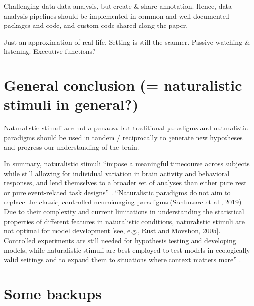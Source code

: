 

%
Challenging data data analysis, but create \& share annotation.
%
Hence, data analysis pipelines should be implemented in common and
well-documented packages and code, and custom code shared along the paper.

%
Just an approximation of real life.
%
Setting is still the scanner.
%
Passive watching \& listening.
%
Executive functions?



\section{General conclusion (= naturalistic stimuli in general?)}
%
Naturalistic stimuli are not a panacea but traditional paradigms and
naturalistic paradigms should be used in tandem / reciprocally to generate new
hypotheses and progress our understanding of the brain.

%
In summary, naturalistic stimuli ``impose a meaningful timecourse across
subjects while still allowing for individual variation in brain activity and
behavioral responses, and lend themselves to a broader set of analyses than
either pure rest or pure event-related task designs'' \citep{finn2017can}.
%
``Naturalistic paradigms do not aim to replace the classic, controlled
neuroimaging paradigms (Sonkusare et al., 2019). Due to their complexity and
current limitations in understanding the statistical properties of different
features in naturalistic conditions, naturalistic stimuli are not optimal for
model development [see, e.g., Rust and Movshon, 2005]. Controlled experiments
are still needed for hypothesis testing and developing models, while
naturalistic stimuli are best employed to test models in ecologically valid
settings and to expand them to situations where context matters
more'' \citep{saarimaki2021naturalistic}.


\section{Some backups}

